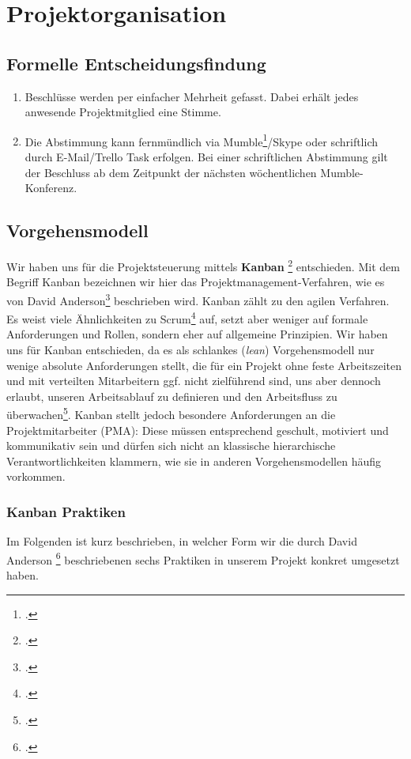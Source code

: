 
\section{Projektorganisation}

\subsection{Formelle Entscheidungsfindung}
\begin{enumerate}
\item Beschlüsse werden per einfacher Mehrheit gefasst. Dabei erhält jedes anwesende Projektmitglied eine Stimme.
\item Die Abstimmung kann fernmündlich via Mumble\footcite{mumble}/Skype oder schriftlich durch E-Mail/Trello Task erfolgen. Bei einer schriftlichen Abstimmung gilt der Beschluss ab dem Zeitpunkt der nächsten wöchentlichen Mumble-Konferenz.
\end{enumerate}

\subsection{Vorgehensmodell}
Wir haben uns für die Projektsteuerung mittels \textbf{Kanban} \footcite{wikiKanban} entschieden. Mit dem Begriff Kanban bezeichnen wir hier das Projektmanagement-Verfahren, wie es von David Anderson\footcite{anderson2011kanban} beschrieben wird. Kanban zählt zu den agilen Verfahren. Es weist viele Ähnlichkeiten zu Scrum\footcite{wikiScrum} auf, setzt aber weniger auf formale Anforderungen und Rollen, sondern eher auf allgemeine Prinzipien. Wir haben uns für Kanban entschieden, da es als schlankes (\textit{lean}) Vorgehensmodell nur wenige absolute Anforderungen stellt, die für ein Projekt ohne feste Arbeitszeiten und mit verteilten Mitarbeitern ggf. nicht zielführend sind, uns aber dennoch erlaubt, unseren Arbeitsablauf zu definieren und den Arbeitsfluss zu überwachen\footcite{whyKanban}. Kanban stellt jedoch besondere Anforderungen an die Projektmitarbeiter (PMA): Diese müssen entsprechend geschult, motiviert und kommunikativ sein und dürfen sich nicht an klassische hierarchische Verantwortlichkeiten klammern, wie sie in anderen Vorgehensmodellen häufig vorkommen.

\subsubsection{Kanban Praktiken}
Im Folgenden ist kurz beschrieben, in welcher Form wir die durch David Anderson \footcite{anderson2011kanban} beschriebenen sechs Praktiken in unserem Projekt konkret umgesetzt haben.


